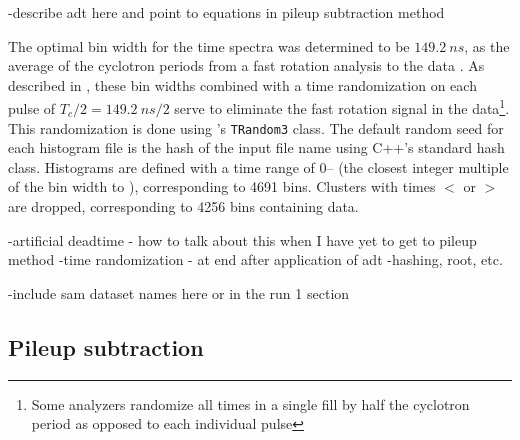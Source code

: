 -describe adt here and point to equations in pileup subtraction method




The optimal bin width for the time spectra was determined to be $\SI{149.2}{ns}$, as the average of the cyclotron periods from a fast rotation analysis to the data \cite{fastrotationsomething}. As described in , these bin widths combined with a time randomization on each pulse of $T_{c}/2 = \SI{149.2}{ns} / 2$ serve to eliminate the fast rotation signal in the data\footnote{Some analyzers randomize all times in a single fill by half the cyclotron period as opposed to each individual pulse}. This randomization is done using \ROOT's \texttt{TRandom3} class. The default random seed for each histogram \ROOT file is the hash of the input file name using C++'s standard hash class. Histograms are defined with a time range of 0-- (the closest integer multiple of the bin width to ), corresponding to 4691 bins. Clusters with times $<$  or $>$  are dropped, corresponding to 4256 bins containing data.





-artificial deadtime - how to talk about this when I have yet to get to pileup method 
-time randomization - at end after application of adt
-hashing, root, etc. 


-include sam dataset names here or in the run 1 section





\subsection{Pileup subtraction}
\label{sub:pileupsubtraction}


